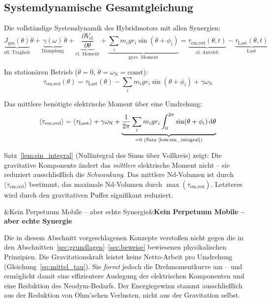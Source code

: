 ﻿\documentclass[12pt, a4paper]{report}
\newenvironment{hinweis}[1][]{%
  \begin{hinweisframe}\sloppy%
  \ifx&#1&\else\textbf{#1}\par\smallskip\fi}{\end{hinweisframe}}
\theoremstyle{definition}
\theoremstyle{remark}
\begin{document}
\subsection{Systemdynamische Gesamtgleichung}

Die vollständige Systemdynamik des Hybridmotors mit allen Synergien:
\begin{equation}
  \underbrace{J_{\text{ges}}(\theta)}_{\text{eff. Trägheit}}
  \ddot\theta
  + \underbrace{\gamma(\omega)}_{\text{Dämpfung}} \dot\theta
  + \underbrace{\frac{\partial V_{\text{el}}}{\partial\theta}}_{\text{el.\ Moment}}
  + \underbrace{\sum_i m_i g r_i \sin(\theta+\phi_i)}_{\text{grav.\ Moment}}
  = \underbrace{\tau_{\text{em,red}}(\theta, t)}_{\text{el.\ Antrieb}}
  - \underbrace{\tau_{\text{Last}}(\theta, t)}_{\text{Last}}
  \label{eq:gesamt_dyn}
\end{equation}

Im stationären Betrieb ($\ddot\theta = 0$, $\dot\theta = \omega_\text{N} = \text{const}$):
\begin{equation}
  \tau_{\text{em,red}}(\theta) = \tau_{\text{Last}}(\theta)
    - \sum_i m_i g r_i \sin(\theta+\phi_i)
    + \gamma\omega_\text{N}
  \label{eq:stationaer}
\end{equation}

Das mittlere benötigte elektrische Moment über eine Umdrehung:
\begin{equation}
  \langle\tau_{\text{em,red}}\rangle = \langle\tau_{\text{Last}}\rangle + \gamma\omega_\text{N}
  + \underbrace{\frac{1}{2\pi}\sum_i m_i g r_i
    \int_0^{2\pi}\sin(\theta+\phi_i)\,\dd\theta}_{= 0 \text{ (Satz~\ref{lem:sin_integral})}}
  \label{eq:mittel_tau}
\end{equation}

Satz~\ref{lem:sin_integral} (Nullintegral des Sinus über Vollkreis) zeigt: Die gravitative
Komponente ändert das \emph{mittlere} elektrische Moment nicht -- sie reduziert
ausschließlich die \emph{Schwankung}. Das mittlere Nd-Volumen ist durch
$\langle\tau_{\text{em,red}}\rangle$ bestimmt, das maximale Nd-Volumen durch
$\max(\tau_{\text{em,red}})$. Letzteres wird durch den gravitativen Puffer signifikant
reduziert.

\begin{hinweis}[Kein Perpetuum Mobile -- aber echte Synergie]
  Die in diesem Abschnitt vorgeschlagenen Konzepte verstoßen nicht gegen die
  in den Abschnitten~\ref{sec:grundlagen}--\ref{sec:beweise} bewiesenen
  physikalischen Prinzipien. Die Gravitationskraft leistet keine Netto-Arbeit
  pro Umdrehung (Gleichung~\eqref{eq:mittel_tau}). Sie \emph{formt} jedoch
  die Drehmomentkurve um -- und ermöglicht damit eine effizientere Auslegung
  der elektrischen Komponenten und eine Reduktion des Neodym-Bedarfs.
  Der Energiegewinn stammt ausschließlich aus der Reduktion von Ohm'schen
  Verlusten, nicht aus der Gravitation selbst.
\end{hinweis}
\end{document}
